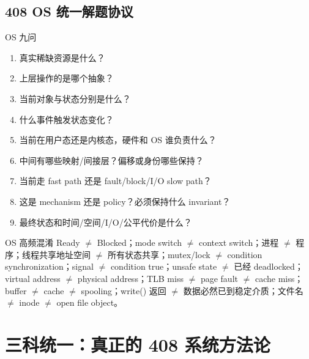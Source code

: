 \documentclass[11pt,a4paper,openany]{ctexbook}
\begin{document}
\section{408 OS 统一解题协议}
\begin{examBox}{OS 九问}
\begin{enumerate}
  \item 真实稀缺资源是什么？
  \item 上层操作的是哪个抽象？
  \item 当前对象与状态分别是什么？
  \item 什么事件触发状态变化？
  \item 当前在用户态还是内核态，硬件和 OS 谁负责什么？
  \item 中间有哪些映射/间接层？偏移或身份哪些保持？
  \item 当前走 fast path 还是 fault/block/I/O slow path？
  \item 这是 mechanism 还是 policy？必须保持什么 invariant？
  \item 最终状态和时间/空间/I/O/公平代价是什么？
\end{enumerate}
\end{examBox}

\begin{warnbox}{OS 高频混淆}
Ready $\neq$ Blocked；mode switch $\neq$ context switch；进程 $\neq$ 程序；线程共享地址空间 $\neq$ 所有状态共享；mutex/lock $\neq$ condition synchronization；signal $\neq$ condition true；unsafe state $\neq$ 已经 deadlocked；virtual address $\neq$ physical address；TLB miss $\neq$ page fault $\neq$ cache miss；buffer $\neq$ cache $\neq$ spooling；write() 返回 $\neq$ 数据必然已到稳定介质；文件名 $\neq$ inode $\neq$ open file object。
\end{warnbox}

\chapter{三科统一：真正的 408 系统方法论}
\end{document}
